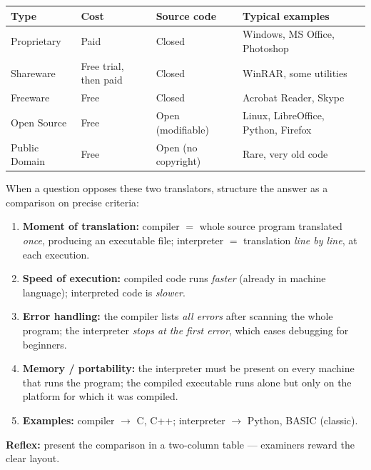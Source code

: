 \documentclass[11pt]{article}
\begin{document}
\begin{aretenir}
\begin{center}
\begin{tabularx}{\linewidth}{|l|X|X|X|}
\hline
\rowcolor{popblueL} \textbf{Type} & \textbf{Cost} & \textbf{Source code} & \textbf{Typical examples} \\
\hline
Proprietary & Paid & Closed & Windows, MS Office, Photoshop \\
\hline
Shareware & Free trial, then paid & Closed & WinRAR, some utilities \\
\hline
Freeware & Free & Closed & Acrobat Reader, Skype \\
\hline
Open Source & Free & Open (modifiable) & Linux, LibreOffice, Python, Firefox \\
\hline
Public Domain & Free & Open (no copyright) & Rare, very old code \\
\hline
\end{tabularx}
\end{center}
\end{aretenir}

\begin{methode}
When a question opposes these two translators, structure the answer as a comparison on precise criteria:
\begin{enumerate}
\item \textbf{Moment of translation:} compiler $=$ whole source program translated \emph{once}, producing an executable file; interpreter $=$ translation \emph{line by line}, at each execution.
\item \textbf{Speed of execution:} compiled code runs \emph{faster} (already in machine language); interpreted code is \emph{slower}.
\item \textbf{Error handling:} the compiler lists \emph{all errors} after scanning the whole program; the interpreter \emph{stops at the first error}, which eases debugging for beginners.
\item \textbf{Memory / portability:} the interpreter must be present on every machine that runs the program; the compiled executable runs alone but only on the platform for which it was compiled.
\item \textbf{Examples:} compiler $\to$ C, C++; interpreter $\to$ Python, BASIC (classic).
\end{enumerate}
\textbf{Reflex:} present the comparison in a two-column table --- examiners reward the clear layout.
\end{methode}
\end{document}
